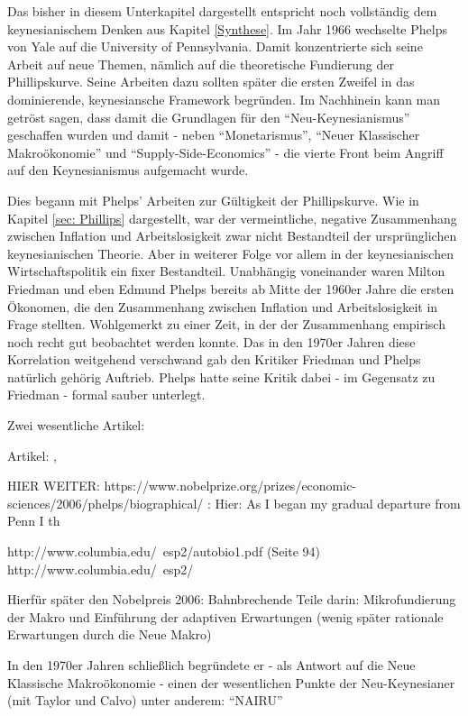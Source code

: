 Das bisher in diesem Unterkapitel dargestellt entspricht noch vollständig dem keynesianischem Denken aus Kapitel \ref{Synthese}. Im Jahr 1966 wechselte Phelps von Yale auf die University of Pennsylvania. Damit konzentrierte sich seine Arbeit auf neue Themen, nämlich auf die theoretische Fundierung der Phillipskurve. 
Seine Arbeiten dazu sollten später die ersten Zweifel in das dominierende, keynesiansche Framework begründen. Im Nachhinein kann man getröst sagen, dass damit die Grundlagen für den "`Neu-Keynesianismus"' geschaffen wurden und damit - neben "`Monetarismus"', "`Neuer Klassischer Makroökonomie"' und "`Supply-Side-Economics"' - die vierte Front beim Angriff auf den Keynesianismus aufgemacht wurde.

Dies begann mit Phelps' Arbeiten zur Gültigkeit der Phillipskurve. Wie in Kapitel \ref{sec: Phillips} dargestellt, war der vermeintliche, negative Zusammenhang zwischen Inflation und Arbeitslosigkeit zwar nicht Bestandteil der ursprünglichen keynesianischen Theorie. Aber in weiterer Folge vor allem in der keynesianischen Wirtschaftspolitik ein fixer Bestandteil. Unabhängig voneinander waren Milton Friedman und eben Edmund Phelps bereits ab Mitte der 1960er Jahre die ersten Ökonomen, die den Zusammenhang zwischen Inflation und Arbeitslosigkeit in Frage stellten. Wohlgemerkt zu einer Zeit, in der der Zusammenhang empirisch noch recht gut beobachtet werden konnte. Das in den 1970er Jahren diese Korrelation weitgehend verschwand gab den Kritiker Friedman und Phelps natürlich gehörig Auftrieb. Phelps hatte seine Kritik dabei - im Gegensatz zu Friedman - formal sauber unterlegt. 

Zwei wesentliche Artikel:

Artikel: \textcite{Phelps1967}, \textcite{Phelps1968}

HIER WEITER: 
https://www.nobelprize.org/prizes/economic-sciences/2006/phelps/biographical/  : Hier: As I began my gradual departure from Penn I th

http://www.columbia.edu/~esp2/autobio1.pdf (Seite 94)
http://www.columbia.edu/~esp2/

Hierfür später den Nobelpreis 2006:
Bahnbrechende Teile darin:
Mikrofundierung der Makro
und Einführung der adaptiven Erwartungen (wenig später rationale Erwartungen durch die Neue Makro)



In den 1970er Jahren schließlich begründete er - als Antwort auf die Neue Klassische Makroökonomie - einen der wesentlichen Punkte der Neu-Keynesianer (mit Taylor und Calvo) unter anderem: "`NAIRU"'


